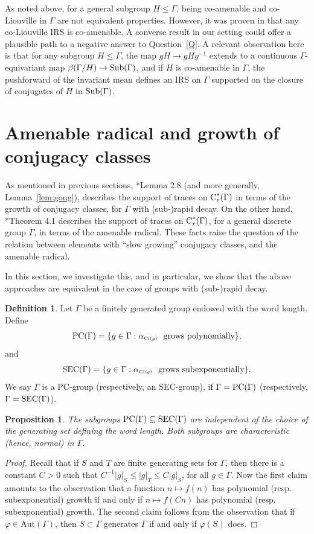 \documentclass[12pt]{amsart}
\newtheorem{prop}[theorem]{Proposition}
\theoremstyle{definition}
\newtheorem{defn}[theorem]{Definition}
\theoremstyle{remark}
\newcommand{\G}{\Gamma}
\begin{document}
As noted above, for a general subgroup $H\le \G$, being co-amenable and co-Liouville in $\G$ are not equivalent properties. However, it was proven in \cite{Hart-Tamuz} that any co-Liouville IRS is co-amenable. A converse result in our setting could offer a plausible path to a negative answer to Question~\ref{Q}. A relevant observation here is that for any subgroup $H\le\G$, the map $gH\to gHg^{-1}$ extends to a continuous $\G$-equivariant map $\beta( \G/H)\to {\rm Sub}(\G)$, and if $H$ is co-amenable in $\G$, the pushforward of the invariant mean defines an IRS on $\G$ supported on the closure of conjugates of $H$ in ${\rm Sub}(\G)$.






\section{Amenable radical and growth of conjugacy classes}

As mentioned in previous sections, \cite{gong2015}*{Lemma 2.8} (and more generally, Lemma~\ref{lem:gong}),
describes the support of traces on $\textup{C}^*_r(\G)$ in terms of the growth of conjugacy classes,
for $\G$ with (sub-)rapid decay. On the other hand, \cite{BKKO2017}*{Theorem 4.1} describes the support of traces on $\textup{C}^*_r(\G)$, for a general discrete group $\G$, in terms of the amenable radical. 
These facts raise the question of the relation between elements with ``slow growing'' conjugacy classes, and the amenable radical.

In this section, we investigate this, and in particular, we show that the above approaches are equivalent in the case of groups with (sub-)rapid decay. 

\begin{defn}
Let $\Gamma$ be a finitely generated group endowed with the word length. Define
\[
\textup{PC}(\Gamma) = \{g\in\Gamma: \alpha_{\scriptscriptstyle {\rm Cl}(g)} ~\text{ grows polynomially}\},
\]
and
\[
\textup{SEC}(\Gamma) = \{g\in\Gamma: \alpha_{\scriptscriptstyle {\rm Cl}(g)} ~\text{ grows subexponentially}\}.
\]
We say $\G$ is a {PC-group} (respectively, an {SEC-group}),
if $\Gamma = \textup{PC}(\Gamma)$ (respectively, $\Gamma = \textup{SEC}(\Gamma)$). 
\end{defn}


\begin{prop} 
The subgroups $\textup{PC}(\Gamma)\subseteq\textup{SEC}(\Gamma)$ are independent of the choice of the generating set defining the word length. Both subgroups are characteristic (hence, normal) in $\G$.
\end{prop}
\begin{proof}
Recall that if $S$ and $T$ are finite generating sets for $\Gamma$, then there is a constant $C > 0$ such that $C^{-1}|g|_S\leq |g|_T\leq C|g|_S$, for all $g\in\Gamma$. Now the first claim amounts to the observation that a function $n\mapsto f(n)$ has polynomial (resp. subexponential) growth if and only if $n\mapsto f(Cn)$ has polynomial (resp. subexponential) growth. The second claim follows from the observation that if $\varphi\in \text{Aut}(\G)$, then $S\subset\G$ generates $\G$ if and only if $\varphi(S)$ does.
\end{proof}
\end{document}
